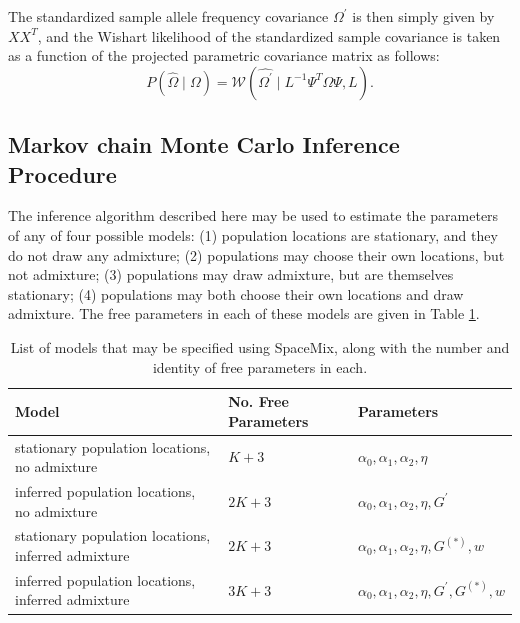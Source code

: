 \documentclass[12pt]{article}
\newcommand{\identifyadmixsource}[1]{{#1^{(*)}}}
\begin{document}
%
The standardized sample allele frequency covariance $\Omega^{\prime}$ is then simply given by $XX^{T}$, and the Wishart likelihood of the standardized sample covariance is taken as a function of the projected parametric covariance matrix as follows:
%
\begin{equation}
\label{eq:projected_wishart_dist}
P(\widehat{\Omega} \mid \Omega) = \mathcal{W}\left(\widehat{\Omega^{\prime}} \mid L^{-1} \Psi^{T}   \Omega   \Psi,L \right) \text{.}
\end{equation}
%

\subsection*{Markov chain Monte Carlo Inference Procedure}
The inference algorithm described here may be used to estimate the parameters of any of four possible models: (1) population locations are stationary, and they do not draw any admixture; (2) populations may choose their own locations, but not admixture; (3) populations may draw admixture, but are themselves stationary; (4) populations may both choose their own locations and draw admixture.  The free parameters in each of these models are given in Table \ref{tab:model_options}.

\begin{centering}
\begin{table}
\begin{tabular}{| >{\centering\arraybackslash}m{6cm} | >{\centering\arraybackslash}m{3cm} | l |}
	\hline
	\textbf{Model} & \textbf{No. Free Parameters} & \textbf{Parameters}\\ \hline
	stationary population locations, no admixture & $K + 3$	& $\alpha_0,\alpha_1,\alpha_2,\eta$	\\ \hline
	inferred population locations, \hspace{0.5cm}no admixture & $2K + 3$	& $\alpha_0,\alpha_1,\alpha_2,\eta,G^{\prime}$	\\ \hline
	stationary population locations, inferred admixture & $2K + 3$	& $\alpha_0,\alpha_1,\alpha_2,\eta,\identifyadmixsource{G},w$	\\ \hline
	inferred population locations, inferred admixture & $3K + 3$	&$\alpha_0,\alpha_1,\alpha_2,\eta,G^{\prime},\identifyadmixsource{G},w$	\\
	\hline
\end{tabular}
\caption{List of models that may be specified using SpaceMix, along with the number and identity of free parameters in each.}\label{tab:model_options}
\end{table}
\end{centering}
\end{document}
